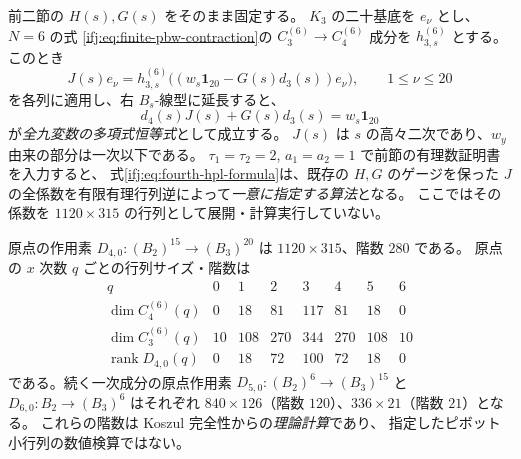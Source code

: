 \begin{proposition}[$P_3\to P_4$ の有限有理行列構成式]
\label{ifj:prop:shamash-fourth-finite-formula}
前二節の $H(s),G(s)$ をそのまま固定する。
$K_3$ の二十基底を $e_\nu$ とし、$N=6$ の式
\eqref{ifj:eq:finite-pbw-contraction}の $C_3^{(6)}\to C_4^{(6)}$ 成分を
$h_{3,s}^{(6)}$ とする。このとき
\begin{equation}\label{ifj:eq:fourth-hpl-formula}
 \boxed{\displaystyle
 J(s)e_\nu
 =h_{3,s}^{(6)}\bigl((w_s\mathbf1_{20}-G(s)d_3(s))e_\nu\bigr),
 \qquad 1\le\nu\le20}
\end{equation}
を各列に適用し、右 $B_s$-線型に延長すると、
\[
 d_4(s)J(s)+G(s)d_3(s)=w_s\mathbf1_{20}
\]
が\emph{全九変数の多項式恒等式}として成立する。
$J(s)$ は $s$ の高々二次であり、$w_y$ 由来の部分は一次以下である。
$\tau_1=\tau_2=2$, $a_1=a_2=1$ で前節の有理数証明書を入力すると、
式\eqref{ifj:eq:fourth-hpl-formula}は、既存の $H,G$ のゲージを保った
$J$ の全係数を有限有理行列逆によって\emph{一意に指定する算法}となる。
ここではその係数を $1120\times315$ の行列として展開・計算実行していない。

原点の作用素 $D_{4,0}:(B_2)^{15}\to(B_3)^{20}$ は
$1120\times315$、階数 $280$ である。
原点の $x$ 次数 $q$ ごとの行列サイズ・階数は
\begin{equation}\label{ifj:eq:fourth-origin-block-ranks}
\begin{array}{c|rrrrrrr}
q&0&1&2&3&4&5&6\\\hline
\dim C_4^{(6)}(q)&0&18&81&117&81&18&0\\
\dim C_3^{(6)}(q)&10&108&270&344&270&108&10\\
\operatorname{rank}D_{4,0}(q)&0&18&72&100&72&18&0
\end{array}
\end{equation}
である。続く一次成分の原点作用素
$D_{5,0}:(B_2)^6\to(B_3)^{15}$ と
$D_{6,0}:B_2\to(B_3)^6$ はそれぞれ
$840\times126$（階数 $120$）、$336\times21$（階数 $21$）となる。
これらの階数は Koszul 完全性からの\emph{理論計算}であり、
指定したピボット小行列の数値検算ではない。
\end{proposition}


